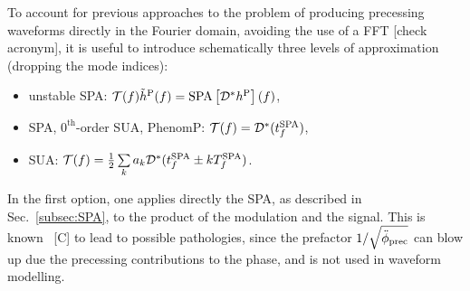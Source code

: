 \documentclass[aps,showpacs,twocolumn,
prd,superscriptaddress,nofootinbib]{revtex4-1}
\newcommand\calT{{\mathcal{T}}}
\newcommand\calD{{\mathcal{D}}}
\newcommand{\SM}[1]{{\color{Red} #1}}
\begin{document}
To account for previous approaches to the problem of producing precessing waveforms directly in the Fourier domain, avoiding the use of a FFT \SM{[check acronym]}, it is useful to introduce schematically three levels of approximation (dropping the mode indices):
\begin{itemize}
	\item unstable SPA: $\calT(f) \tilde{h}^{\rm P}(f) = \mathrm{SPA}\left[ \calD^{*} h^{\rm P} \right](f)$,
	\item SPA, $0^{\text{th}}$-order SUA, PhenomP: $\calT(f) = \calD^{*}(t_{f}^{\rm SPA}) $,
	\item SUA: $\calT(f) = \frac{1}{2} \sum\limits_{k} a_{k} \calD^{*}(t_{f}^{\rm SPA} \pm k T_{f}^{\rm SPA})$.
\end{itemize}

In the first option, one applies directly the SPA, as described in Sec.~\ref{subsec:SPA}, to the product of the modulation and the signal. This is known~\cite{} \SM{[C]} to lead to possible pathologies, since the prefactor $1/\sqrt{\ddot{\phi}_{\rm prec}}$ can blow up due the precessing contributions to the phase, and is not used in waveform modelling.
\end{document}
